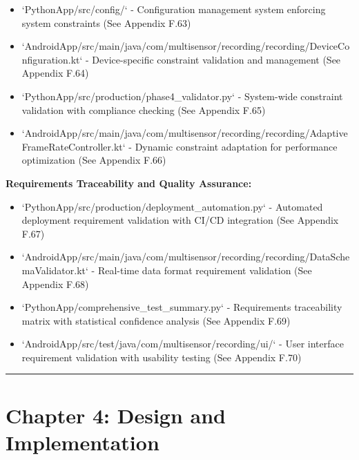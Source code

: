 \documentclass[12pt,a4paper]{report}
\begin{document}
\begin{itemize}
\item `PythonApp/src/config/` - Configuration management system enforcing system constraints (See Appendix F.63)
\item `AndroidApp/src/main/java/com/multisensor/recording/recording/DeviceConfiguration.kt` - Device-specific constraint
  validation and management (See Appendix F.64)
\item `PythonApp/src/production/phase4_validator.py` - System-wide constraint validation with compliance checking (See
  Appendix F.65)
\item `AndroidApp/src/main/java/com/multisensor/recording/recording/AdaptiveFrameRateController.kt` - Dynamic constraint
  adaptation for performance optimization (See Appendix F.66)

\end{itemize}
\textbf{Requirements Traceability and Quality Assurance:}

\begin{itemize}
\item `PythonApp/src/production/deployment_automation.py` - Automated deployment requirement validation with CI/CD
  integration (See Appendix F.67)
\item `AndroidApp/src/main/java/com/multisensor/recording/recording/DataSchemaValidator.kt` - Real-time data format
  requirement validation (See Appendix F.68)
\item `PythonApp/comprehensive_test_summary.py` - Requirements traceability matrix with statistical confidence analysis (See
  Appendix F.69)
\item `AndroidApp/src/test/java/com/multisensor/recording/ui/` - User interface requirement validation with usability
  testing (See Appendix F.70)

\end{itemize}
\hrule

\section{Chapter 4: Design and Implementation}
\end{document}
